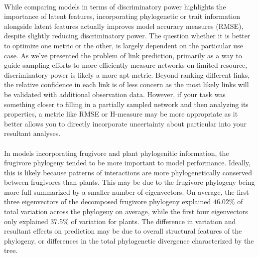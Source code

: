 \documentclass[num-refs]{wiley-article}%
\begin{document}
\paragraph*{} 
While comparing models in terms of discriminatory power highlights the importance of latent features, incorporating phylogenetic or trait information alongside latent features actually improves model accuracy measures (RMSE), despite slightly reducing discriminatory power. The question whether it is better to optimize one metric or the other, is largely dependent on the particular use case. As we've presented the problem of link prediction, primarily as a way to guide sampling efforts to more efficiently measure networks on limited resource, discriminatory power is likely a more apt metric. Beyond ranking different links, the relative confidence in each link is of less concern as the most likely links will be validated with additional observation data. However, if your task was something closer to filling in a partially sampled network and then analyzing its properties, a metric like RMSE or H-measure\cite{hand2009measuring} may be more appropriate as it better allows you to directly incorporate uncertainty about particular into your resultant analyses. 


\paragraph*{} In models incorporating frugivore and plant phylogenitic information, the frugivore phylogeny tended to be more important to model performance. Ideally, this is likely because patterns of interactions are more phylogenetically conserved between frugivores than plants. This may be due to the frugivore phylogeny being more full summarized by a smaller number of eigenvectors. On average, the first three eigenvectors of the decomposed frugivore phylogeny explained $46.02\%$ of total variation across the phylogeny on average, while the first four eigenvectors only explained 37.5\% of variation for plants.%
The difference in variation and resultant effects on prediction may be due to overall structural features of the phylogeny, or differences in the total phylogenetic divergence characterized by the tree.
\end{document}

